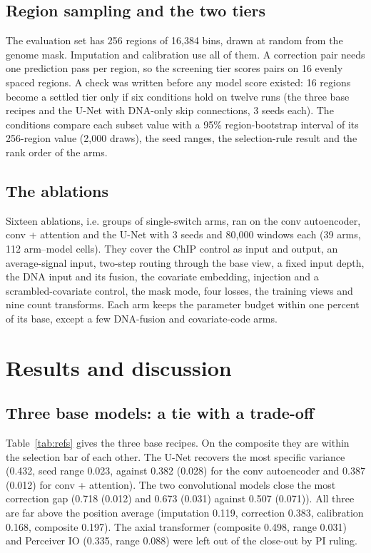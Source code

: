 \documentclass[pdflatex,sn-mathphys-num]{sn-jnl}
\newcommand{\lit}[1]{#1}
\newcommand{\cl}[1]{#1}
\newcommand{\compAxial}{0.498}
\newcommand{\compAxialR}{0.031}
\newcommand{\compPerc}{0.335}
\newcommand{\compPercR}{0.088}
\newcommand{\nArmRows}{39}
\newcommand{\nBoot}{2{,}000}
\newcommand{\nCells}{112}
\newcommand{\nRegionBins}{16{,}384}
\newcommand{\nRegions}{256}
\newcommand{\paCal}{0.168}
\newcommand{\paComp}{0.197}
\newcommand{\paCor}{0.383}
\newcommand{\paImp}{0.119}
\newcommand{\refAECor}{0.718}
\newcommand{\refAECorR}{0.012}
\newcommand{\refAEImp}{0.382}
\newcommand{\refAEImpR}{0.028}
\newcommand{\refATCor}{0.673}
\newcommand{\refATCorR}{0.031}
\newcommand{\refATImp}{0.387}
\newcommand{\refATImpR}{0.012}
\newcommand{\refUNCor}{0.507}
\newcommand{\refUNCorR}{0.071}
\newcommand{\refUNImp}{0.432}
\newcommand{\refUNImpR}{0.023}
\begin{document}
\subsection{Region sampling and the two tiers}

\cl{The evaluation set has \nRegions{} regions of \nRegionBins{} bins, drawn at random from the genome mask. Imputation and calibration use all of them. A correction pair needs one prediction pass per region, so the screening tier scores pairs on \lit{16} evenly spaced regions. A check was written before any model score existed: \lit{16} regions become a settled tier only if six conditions hold on twelve runs (the three base recipes and the U-Net with DNA-only skip connections, \lit{3} seeds each). The conditions compare each subset value with a \lit{95}\% region-bootstrap interval of its \lit{256}-region value (\nBoot{} draws), the seed ranges, the selection-rule result and the rank order of the arms.}

\subsection{The ablations}

\cl{Sixteen ablations, i.e. groups of single-switch arms, ran on the conv autoencoder, conv + attention and the U-Net with \lit{3} seeds and \lit{80,000} windows each (\nArmRows{} arms, \nCells{} arm--model cells). They cover the ChIP control as input and output, an average-signal input, two-step routing through the base view, a fixed input depth, the DNA input and its fusion, the covariate embedding, injection and a scrambled-covariate control, the mask mode, four losses, the training views and nine count transforms. Each arm keeps the parameter budget within one percent of its base, except a few DNA-fusion and covariate-code arms.}

\section{Results and discussion}\label{sec:results}

\subsection{Three base models: a tie with a trade-off}

\cl{Table~\ref{tab:refs} gives the three base recipes. On the composite they are within the selection bar of each other. The U-Net recovers the most specific variance (\refUNImp{}, seed range \refUNImpR{}, against \refAEImp{} (\refAEImpR{}) for the conv autoencoder and \refATImp{} (\refATImpR{}) for conv + attention). The two convolutional models close the most correction gap (\refAECor{} (\refAECorR{}) and \refATCor{} (\refATCorR{}) against \refUNCor{} (\refUNCorR{})). All three are far above the position average (imputation \paImp{}, correction \paCor{}, calibration \paCal{}, composite \paComp{}). The axial transformer (composite \compAxial{}, range \compAxialR{}) and Perceiver IO (\compPerc{}, range \compPercR{}) were left out of the close-out by PI ruling.}
\end{document}
